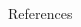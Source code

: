 \documentclass[final]{beamer}
\begin{document}
\begin{frame}
\begin{multicols}{3}
\begin{column}{.325\textwidth}
\begin{block}{References}
  \justify
    \begin{footnotesize} %
    \nocite{*} %
    
        
    \end{footnotesize}
\end{block}
\end{column}

\end{multicols}
\end{frame}
\end{document}

